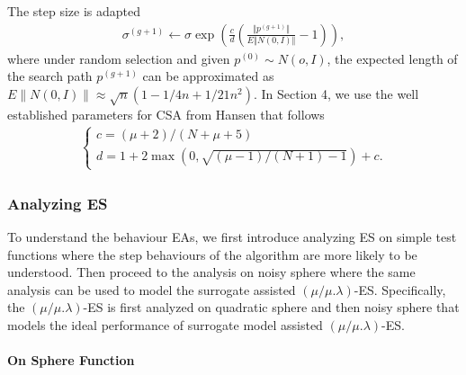 The step size is adapted 
\begin{align}
\sigma^{(g+1)} \leftarrow \sigma \exp \left (  \frac{c}{d}  \left( \frac{\Vert p^{(g+1)}\Vert}{E \Vert N(0,I)\Vert } -1 \right) \right ),
\end{align}
where under random selection and given $p^{(0)}\sim N(o,I)$, the expected length of the search path $p^{(g+1)}$ can be approximated as $E\| N(0,I) \| \approx \sqrt{n} (1-1/4n + 1/21n^2)$. In Section 4, we use the well established parameters for CSA from  Hansen \cite{hansen2016cma} that follows 
\begin{align}
\begin{cases}
c = (\mu+2)/(N+\mu+5)\\
d=1+2 \max\left (0, \sqrt{(\mu-1)/(N+1)-1} \right)+c.
\end{cases}
\end{align}


\subsubsection{Analyzing ES}\label{sssec:analysis_sphere_combined}\hfill

To understand the behaviour EAs, we first introduce analyzing ES on simple test functions where the step behaviours of the algorithm are more likely to be understood. Then proceed to the analysis on noisy sphere where the same analysis can be used to model the surrogate assisted $(\mu/\mu.\lambda)$-ES. Specifically, the $(\mu/\mu.\lambda)$-ES is first analyzed on quadratic sphere and then noisy sphere that models the ideal performance of surrogate model assisted $(\mu/\mu.\lambda)$-ES.    

 \paragraph{On Sphere Function}


